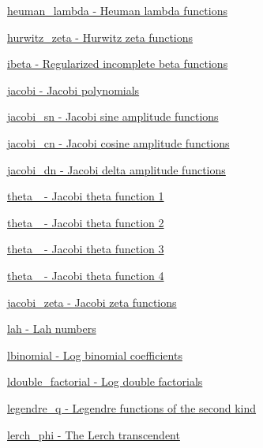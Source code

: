 \begin{DoxyItemize}
\item \hyperlink{group__mathsf__gnu_ga7537f96eedc8571ed1987481b2863e89}{heuman\+\_\+lambda -\/ Heuman lambda functions}
\item \hyperlink{group__mathsf__gnu_ga7b167ce1c8d9aa6aad40fc83a95733bd}{hurwitz\+\_\+zeta -\/ Hurwitz zeta functions}
\item \hyperlink{group__mathsf__gnu_ga1fa9e260ba85fc043e3d2ada99c0143c}{ibeta -\/ Regularized incomplete beta functions}
\item \hyperlink{group__mathsf__gnu_gad54f6601748324d268532138eb38ca33}{jacobi -\/ Jacobi polynomials}
\item \hyperlink{group__mathsf__gnu_ga49d5e18152dd0dd0f496b8c8582e7045}{jacobi\+\_\+sn -\/ Jacobi sine amplitude functions}
\item \hyperlink{group__mathsf__gnu_ga2e1c43b232d378164bed1433041ca7dc}{jacobi\+\_\+cn -\/ Jacobi cosine amplitude functions}
\item \hyperlink{group__mathsf__gnu_ga0f8fa8d6a77dbc2089d65f3f16876aa9}{jacobi\+\_\+dn -\/ Jacobi delta amplitude functions}
\item \hyperlink{group__mathsf__gnu_ga996ca8c1fff75e2d4f196e99e0919933}{theta\+\_ -\/ Jacobi theta function 1}
\item \hyperlink{group__mathsf__gnu_gaf6b13dac1f112a870299d75cb4cf42cc}{theta\+\_ -\/ Jacobi theta function 2}
\item \hyperlink{group__mathsf__gnu_gaf4eac2990db1dadba66ae688ceaa6403}{theta\+\_ -\/ Jacobi theta function 3}
\item \hyperlink{group__mathsf__gnu_ga676501b6284d5702a3dc61252e6c78ab}{theta\+\_ -\/ Jacobi theta function 4}
\item \hyperlink{group__mathsf__gnu_ga639be4ebef9a20572375ec534be52b07}{jacobi\+\_\+zeta -\/ Jacobi zeta functions}
\item \hyperlink{group__mathsf__gnu_gaa3491fabb0a6ef54a946a7a23ca866c7}{lah -\/ Lah numbers}
\item \hyperlink{group__mathsf__gnu_gabfa5aeba56edfa110846fc8e76963bc2}{lbinomial -\/ Log binomial coefficients}
\item \hyperlink{group__mathsf__gnu_ga43bf9a20282d5b9237bf352682a48395}{ldouble\+\_\+factorial -\/ Log double factorials}
\item \hyperlink{group__mathsf__gnu_gadad5b22d0075dca31690907668af568f}{legendre\+\_\+q -\/ Legendre functions of the second kind}
\item \hyperlink{group__mathsf__gnu_ga31d7cfc601a99d72e58f654d0c890fd6}{lerch\+\_\+phi -\/ The Lerch transcendent}

\end{DoxyItemize}
